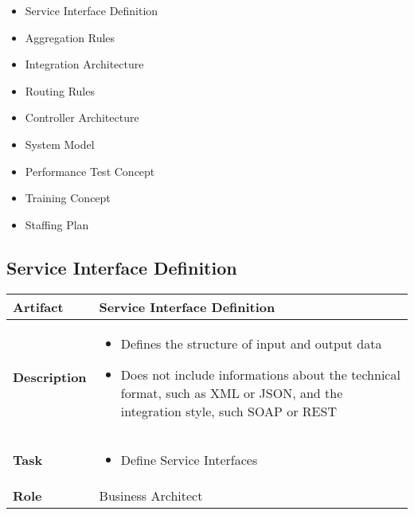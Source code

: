 \begin{itemize}
	\item Service Interface Definition
	\item Aggregation Rules
	\item Integration Architecture
	\item Routing Rules
	\item Controller Architecture
	\item System Model
	\item Performance Test Concept
	\item Training Concept
	\item Staffing Plan
\end{itemize}

\subsection{Service Interface Definition}
\begin{minipage}{\textwidth}
 \label{table:ch6_Artifact_Service_Interface_Definition}
\begin{tabular}
	{|m{2cm}|m{10cm}|} \hline \bfseries Artifact & Service Interface Definition\\
	\hline \bfseries Description & 
	\begin{itemize}
		\item Defines the structure of input and output data
		\item Does not include informations about the technical format, such as \ac{XML} or \ac{JSON}, and the integration style, such SOAP or \ac{REST}
	\end{itemize}
	\\
	\hline \bfseries Task & 
	\begin{itemize}
		\item Define Service Interfaces 
	\end{itemize}
	\\
	\hline \bfseries Role & Business Architect\\
	\hline 
\end{tabular}
\end{minipage}

